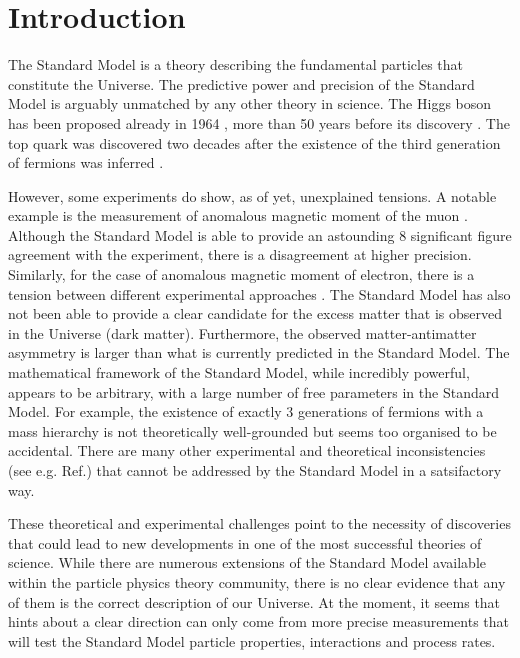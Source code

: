 \chapter{Introduction}\label{sec:introduction}

The Standard Model is a theory describing the fundamental particles that constitute the Universe.
The predictive power and precision of the Standard Model is arguably unmatched by any other theory in science.
The Higgs boson has been proposed already in 1964 \cite{PhysRevLett.13.508}, more than 50 years before its discovery \cite{ATLAS:2012yve,CMS:2012qbp}.
The top quark was discovered \cite{PhysRevLett.74.2632,PhysRevLett.74.2626} two decades after the existence of the third generation of fermions was inferred \cite{HARARI1975265}.

However, some experiments do show, as of yet, unexplained tensions. 
A notable example is the measurement of anomalous magnetic moment of the muon \cite{PhysRevLett.126.141801}.
Although the Standard Model is able to provide an astounding 8 significant figure agreement with the experiment, there is a disagreement at higher precision.
Similarly, for the case of anomalous magnetic moment of electron, there is a tension between different experimental approaches \cite{PhysRevLett.100.120801,Morel:2020dww,Li:2021koa}.
The Standard Model has also not been able to provide a clear candidate for the excess matter that is observed in the Universe (dark matter).
Furthermore, the observed matter-antimatter asymmetry is larger than what is currently predicted in the Standard Model.
The mathematical framework of the Standard Model, while incredibly powerful, appears to be arbitrary, with a large number of free parameters in the Standard Model.
For example, the existence of exactly 3 generations of fermions with a mass hierarchy is not theoretically well-grounded but seems too organised to be accidental.
There are many other experimental and theoretical inconsistencies (see e.g. Ref.\cite{Ellis:2002wba}) that cannot be addressed by the Standard Model in a satsifactory way.

These theoretical and experimental challenges point to the necessity of discoveries that could lead to new developments in one of the most successful theories of science.
While there are numerous extensions of the Standard Model available within the particle physics theory community, there is no clear evidence that any of them is the correct description of our Universe.
At the moment, it seems that hints about a clear direction can only come from more precise measurements that will test the Standard Model particle properties, interactions and process rates.


